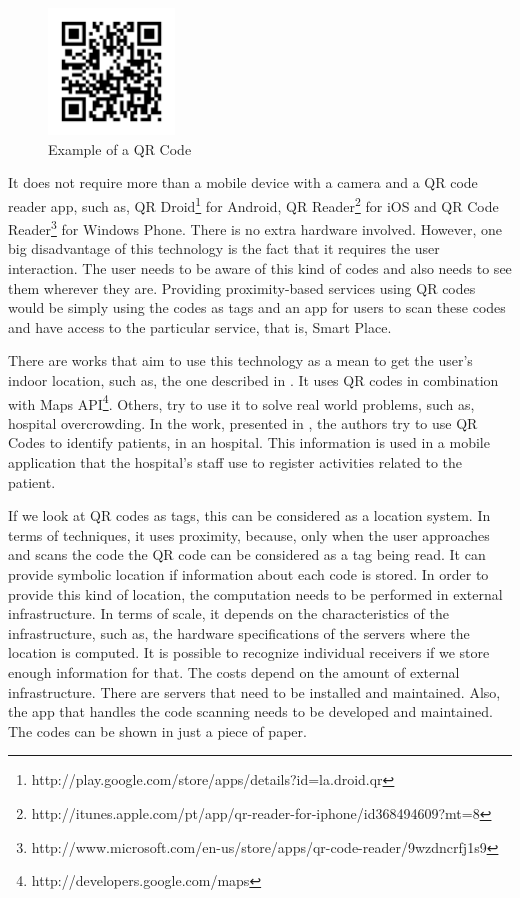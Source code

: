 \begin{figure}[!ht]
  \centering
    \includegraphics[width=0.3\textwidth, keepaspectratio]{images/qr_code}
    \caption{Example of a QR Code}
    \label{fig:qr_code}
\end{figure}

It does not require more than a mobile device with a camera and a \gls{QR} code reader app, such as, QR Droid\footnote{http://play.google.com/store/apps/details?id=la.droid.qr} for Android, QR Reader\footnote{http://itunes.apple.com/pt/app/qr-reader-for-iphone/id368494609?mt=8} for iOS and QR Code Reader\footnote{http://www.microsoft.com/en-us/store/apps/qr-code-reader/9wzdncrfj1s9} for Windows Phone.
There is no extra hardware involved.
However, one big disadvantage of this technology is the fact that it requires the user interaction.
The user needs to be aware of this kind of codes and also needs to see them wherever they are.
Providing proximity-based services using \gls{QR} codes would be simply using the codes as tags and an app for users to scan these codes and have access to the particular service, that is, Smart Place.

There are works that aim to use this technology as a mean to get the user's indoor location, such as, the one described in \cite{qr_indoor}.
It uses \gls{QR} codes in combination with  Maps \gls{API}\footnote{http://developers.google.com/maps}.
Others, try to use it to solve real world problems, such as, hospital overcrowding.
In the work, presented in \cite{qr_hospital}, the authors try to use \gls{QR} Codes to identify patients, in an hospital.
This information is used in a mobile application that the hospital's staff use to register activities related to the patient.

If we look at \gls{QR} codes as tags, this can be considered as a location system.
In terms of techniques, it uses proximity, because, only when the user approaches and scans the code the \gls{QR} code can be considered as a tag being read.
It can provide symbolic location if information about each code is stored.
In order to provide this kind of location, the computation needs to be performed in external infrastructure.
In terms of scale, it depends on the characteristics of the infrastructure, such as, the hardware specifications of the servers where the location is computed.
It is possible to recognize individual receivers if we store enough information for that.
The costs depend on the amount of external infrastructure. There are servers that need to be installed and maintained.
Also, the app that handles the code scanning needs to be developed and maintained. The codes can be shown in just a piece of paper.


